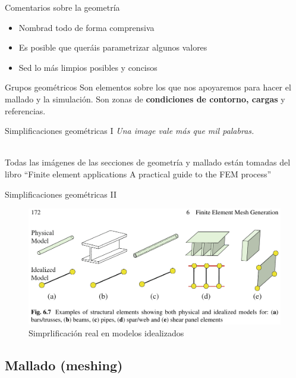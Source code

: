 \documentclass[12pt]{beamer}
\begin{document}
\begin{frame}{Comentarios sobre la geometría}
	\begin{itemize}
		\item Nombrad todo de forma comprensiva
		\item Es posible que queráis parametrizar algunos valores
		\item Sed lo más limpios posibles y concisos
	\end{itemize}
	\begin{block}{Grupos geométricos}
		Son elementos sobre los que nos apoyaremos para hacer el mallado y la simulación. Son zonas de \textbf{condiciones de contorno, cargas} y referencias.
	\end{block}
\end{frame}

\begin{frame}{Simplificaciones geométricas I}
	\textit{Una image vale más que mil palabras.} \\~
	
	Todas las imágenes de las secciones de geometría y mallado están tomadas del libro ``Finite element applications A practical guide to the FEM process''	
\end{frame}

\begin{frame}{Simplificaciones geométricas II}
	\begin{figure}
		\centering
		\includegraphics[width=1\linewidth]{real_idealised_mesh}
		\caption{Simprlificación real en modelos idealizados}
		\label{fig:realidealisedmesh}
	\end{figure}
\end{frame}

\subsection{Mallado (meshing)}
\end{document}
